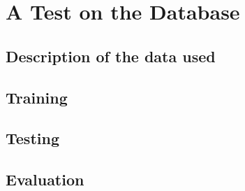 \section{A Test on the Database}
\label{sec:test}
\subsection{Description of the data used}
\subsection{Training}
\subsection{Testing}
\subsection{Evaluation}

	
